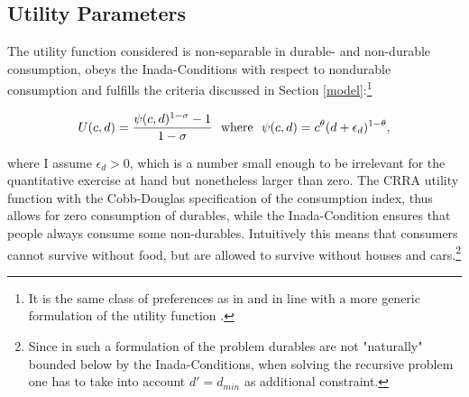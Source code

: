 \documentclass[a4paper,12pt,legno]{article}
\begin{document}
\subsection{Utility Parameters}

The utility function considered is non-separable in durable- and non-durable consumption, obeys the Inada-Conditions with respect to nondurable consumption and fulfills the criteria discussed in Section \ref{model}:\footnote{It is the same class of preferences as in \cite{hintermaier2010} and in line with a more generic formulation of the utility function \citep{FV&K2011}.}

\begin{equation}
U(c,d)=\frac{\psi(c,d)^{1-\sigma}-1}{1-\sigma} \ \ \textnormal{where} \ \ \psi(c,d)=c^{\theta}(d+\epsilon_{d})^{1-\theta},
\end{equation}

where I assume $\epsilon_{d} > 0$, which is a number small enough to be irrelevant for the quantitative exercise at hand but nonetheless larger than zero. The CRRA utility function with the Cobb-Douglas specification of the consumption index, thus allows for zero consumption of durables, while the Inada-Condition ensures that people always consume some non-durables. Intuitively this means that consumers cannot survive without food, but are allowed to survive without houses and cars.\footnote{Since in such a formulation of the problem durables are not "naturally" bounded below by the Inada-Conditions, when solving the recursive problem one has to take into account $d' = d_{min}$ as additional constraint.}
\end{document}
